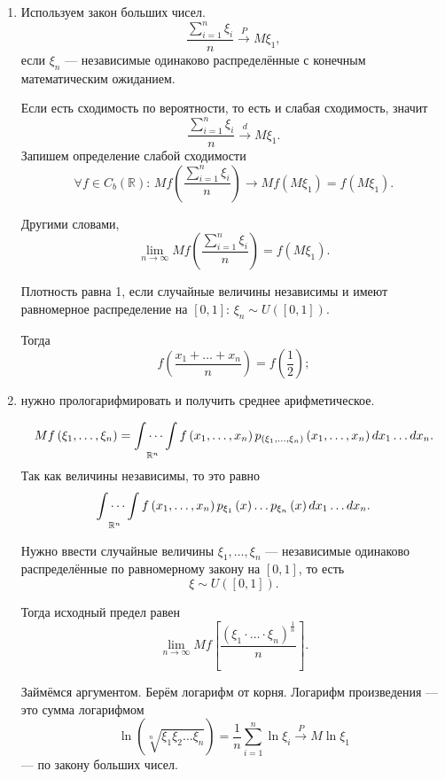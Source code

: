 \begin{enumerate}[label=\alph*)]
\item Используем закон больших чисел.
$$ \frac{ \sum \limits_{i = 1}^n \xi_i}{n} \overset{P}{ \rightarrow } M \xi_1,$$
если $ \xi_n$ --- независимые одинаково распределённые с конечным математическим ожиданием.

Если есть сходимость по вероятности, то есть и слабая сходимость, значит
$$ \frac{ \sum \limits_{i = 1}^n \xi_i}{n} \overset{d}{ \rightarrow } M \xi_1.$$
Запишем определение слабой сходимости
$$ \forall f \in C_b \left( \mathbb{R} \right): \,
  Mf \left( \frac{ \sum \limits_{i = 1}^n \xi_i}{n} \right) \rightarrow Mf \left( M \xi_1 \right) =
  f \left( M \xi_1 \right).$$

Другими словами,
$$ \lim \limits_{n \to \infty } Mf \left( \frac{ \sum \limits_{i = 1}^n \xi_i}{n} \right) =
  f \left( M \xi_1 \right).$$

Плотность равна 1, если случайные величины независимы и имеют равномерное распределение на
$ \left[ 0, 1 \right]: \, \xi_n \sim U \left( \left[ 0, 1 \right] \right) $.

Тогда
$$f \left( \frac{x_1 + \dotsc + x_n}{n} \right) =
  f \left( \frac{1}{2} \right);$$
\item нужно прологарифмировать и получить среднее арифметическое.

$$Mf \left( \xi_1, \dotsc, \xi_n \right) =
  \idotsint \limits_{ \mathbb{R}^n} f \left( x_1, \dotsc, x_n \right)
  p_{ \left( \xi_1, \dotsc, \xi_n \right) } \left( x_1, \dotsc, x_n \right) dx_1 \dotsc dx_n.$$
Так как величины независимы, то это равно
$$ \idotsint \limits_{ \mathbb{R}^n} f \left( x_1, \dotsc, x_n \right)
  p_{ \xi_1} \left( x \right) \dotsc p_{ \xi_n } \left( x \right) dx_1 \dotsc dx_n.$$

Нужно ввести случайные величины $ \xi_1, \dotsc, \xi_n$ ---
независимые одинаково распределённые по равномерному закону на $ \left[ 0, 1 \right]$,
то есть
$$ \xi \sim
  U \left( \left[ 0, 1 \right] \right).$$

Тогда исходный предел равен
$$ \lim \limits_{n \to \infty }
  Mf \left[ \frac{ \left(  \xi_1 \cdot \dotsc \cdot \xi_n \right)^{\frac{1}{n}} }{n} \right].$$

Займёмся аргументом.
Берём логарифм от корня.
Логарифм произведения --- это сумма логарифмом
$$ \ln \left( \sqrt[n]{ \xi_1 \xi_2 \dotsc \xi_n} \right) =
  \frac{1}{n} \sum \limits_{i = 1}^n \ln \xi_i \overset{P}{ \rightarrow } M \ln \xi_1$$
--- по закону больших чисел.


\end{enumerate}
